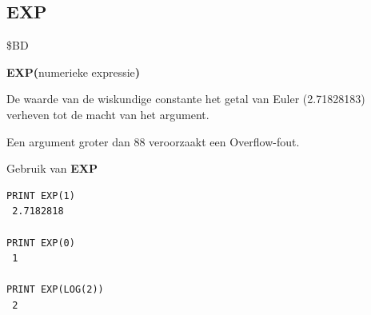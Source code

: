 \subsection{EXP}
\begin{description}[leftmargin=2cm,style=nextline]
\item [Token:]    \$BD

\item [Formaat:]   {\bf EXP(}numerieke expressie{\bf)}

\item [Retourneert:]  De waarde van de wiskundige constante het getal van Euler (2.71828183) verheven tot de macht van het argument.

\item [Opmerkingen:]  Een argument groter dan 88 veroorzaakt een Overflow-fout.

\item [Voorbeelden:] Gebruik van {\bf EXP}

\begin{tcolorbox}[colback=black,coltext=white]
\verbatimfont{\codefont}
\begin{verbatim}
PRINT EXP(1)
 2.7182818

PRINT EXP(0)
 1

PRINT EXP(LOG(2))
 2
\end{verbatim}
\end{tcolorbox}
\end{description}


\newpage
